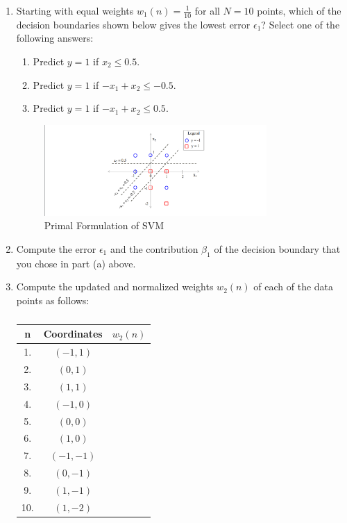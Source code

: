 \documentclass[a3paper,12pt]{extarticle} %
\begin{document}
\begin{enumerate}
    \item  Starting with equal weights $w_1(n) = \frac{1}{10}$ for all $N = 10$ points, which of the decision boundaries shown below gives the lowest error $\epsilon_1$? Select one of the following answers:

\begin{enumerate}
    \item Predict $y = 1$ if $x_2 \leq 0.5$.
    \item  Predict $y = 1$ if $-x_1 + x_2 \leq -0.5$.
    \item  Predict $y = 1$ if $-x_1 + x_2 \leq 0.5$.
\end{enumerate}

\begin{figure}[h!]
    \centering
    \includegraphics[width=0.8\textwidth]{adaboost2.png}
    \caption{Primal Formulation of SVM}
    \label{fig:primal}
\end{figure}


    \item Compute the error $\epsilon_1$ and the contribution $\beta_1$ of the decision boundary that you chose in part (a) above.

\item  Compute the updated and normalized weights $w_2(n)$ of each of the data points as follows:

\begin{table}[h!]
\centering
\begin{tabular}{|c|c|c|}
\hline
\textbf{n} & \textbf{Coordinates} & \textbf{$w_2(n)$} \\ \hline
1. & $(-1, 1)$ & \\ \hline
2. & $(0, 1)$ & \\ \hline
3. & $(1, 1)$ & \\ \hline
4. & $(-1, 0)$ & \\ \hline
5. & $(0, 0)$ & \\ \hline
6. & $(1, 0)$ & \\ \hline
7. & $(-1, -1)$ & \\ \hline
8. & $(0, -1)$ & \\ \hline
9. & $(1, -1)$ & \\ \hline
10. & $(1, -2)$ & \\ \hline
\end{tabular}
\caption{}
\label{table:weights}
\end{table}


\end{enumerate}
\end{document}
